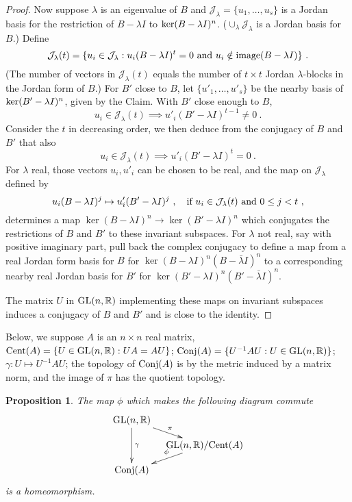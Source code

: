 \documentclass{amsart}
\newtheorem{prop}[theorem]{Proposition}
\theoremstyle{definition}
\theoremstyle{remark}
\numberwithin{equation}{section}
\begin{document}
{{\begin{proof}
Now suppose $\lambda $ is an eigenvalue of $B$ and 
$\mathcal J_{\lambda}= \{u_1, \dots , u_s\}$ is 
a Jordan basis for the restriction of $B-\lambda I$ to 
$\textnormal{ker} (B-\lambda I)^n$. 
($\cup_{\lambda}\mathcal J_{\lambda}$ is a Jordan basis for 
$B$.) 
Define
\[
\mathcal J_{\lambda}(t)= 
\{ u_i \in \mathcal J_{\lambda}: 
u_i(B-\lambda I)^t=0\textnormal{ and }
u_i \notin \textnormal{image}(B-\lambda I)
\}\ . 
\] 
(The number of vectors in
$\mathcal J_{\lambda}(t)$ equals the number of $t\times t$ 
Jordan $\lambda$-blocks  in the Jordan 
form of $B$.) 
For $B'$ close to $B$, 
let $\{u'_1, \dots , u'_s\}$ be the nearby basis of 
$\textnormal{ker} (B'-\lambda I)^n$, given by the Claim. 
With $B'$ close enough to $B$, 
\[
u_i \in \mathcal J_{\lambda}(t) 
\implies 
u'_i(B'-\lambda I)^{t-1}\neq 0 \ . 
\] 
Consider the $t$ in decreasing order, we then deduce 
from the conjugacy of $B$ and $B'$ that also 
\[
u_i \in \mathcal J_{\lambda}(t) 
\implies 
u'_i(B'-\lambda I)^{t}= 0 \ . 
\] 
For $\lambda $ real, those vectors $u_i, u'_i$ can be chosen 
to be real, and the map on 
$\mathcal J_{\lambda}$ defined by 
\[
u_i(B-\lambda I)^j \mapsto u'_i(B'-\lambda I)^j\ , \quad 
\textnormal{if } u_i\in 
\mathcal J_{\lambda}(t) \textnormal{ and } 0\leq j < t \ , 
\] determines a map $\ker(B-\lambda I)^n\to 
\ker(B'-\lambda I)^n$ which conjugates the restrictions of $B$ 
and $B'$ to these invariant subspaces. 
For $\lambda $ not real, say with positive imaginary part, 
pull back the complex conjugacy to define a map from a real 
Jordan form basis for $B$ for $\ker(B-\lambda I)^n(B-\bar\lambda I)^n$ 
to a corresponding nearby real Jordan basis for $B'$ 
for $\ker(B'-\lambda I)^n(B'-\bar\lambda I)^n$. 

The matrix $U $ in $\textnormal{GL}(n,\mathbb R)$ 
implementing these maps on invariant subspaces  
induces a conjugacy of $B$ and $B'$ and is close to the identity. 
\end{proof} 

Below, we suppose $A$ is an $n\times n$ real matrix, 
$\textnormal{Cent}(A)= \{U\in \textnormal{GL}(n,\mathbb R): UA = AU\} $; 
$\textnormal{Conj}(A)= \{U^{-1}AU : U\in \textnormal{GL}(n,\mathbb R)\}$; 
$\gamma : U \mapsto  U^{-1}AU$; the topology of 
$\textnormal{Conj}(A)$ is by the metric induced by a matrix 
norm, and the image of $\pi$ has the quotient topology. 

\begin{prop} \label{fiberprop} 
The map $\phi$ which makes the following diagram commute 
\[
\xymatrix@=
10pt{
\textnormal{GL}(n,\mathbb R)
\ar^{\pi}[rd]  
\ar^{\gamma}[dd] 
&  \\ 
& \textnormal{GL}(n,\mathbb R)/\textnormal{Cent}(A) \ar_{\phi}[dl]   \\ 
\textnormal{Conj}(A) & 
}
\]
is a homeomorphism. 
\end{prop} 

}}
\end{document}
